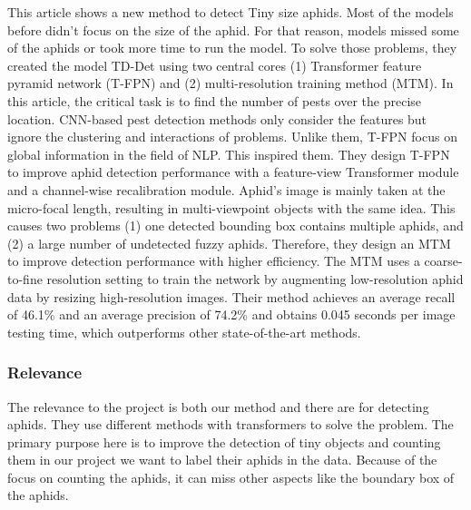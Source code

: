 \documentclass{article}
\begin{document}
This article shows a new method to detect Tiny size aphids. 
Most of the models before didn't focus on the size of the aphid. For that reason, 
models missed some of the aphids or took more time to run the model. To solve those problems, 
they created the model TD-Det using two central cores (1) Transformer feature pyramid network 
(T-FPN) and (2) multi-resolution training method (MTM). In this article, the critical task is to find the 
number of pests over the precise location. CNN-based pest detection methods only consider the 
features but ignore the clustering and interactions of problems. Unlike them, T-FPN focus on global 
information in the field of NLP. This inspired them. They design T-FPN to improve aphid detection 
performance with a feature-view Transformer module and a channel-wise recalibration module. 
Aphid's image is mainly taken at the micro-focal length, resulting in multi-viewpoint objects with the same idea. 
This causes two problems (1) one detected bounding box contains multiple aphids, and (2) a large number of 
undetected fuzzy aphids. Therefore, they design an MTM to improve detection performance with higher efficiency. 
The MTM uses a coarse-to-fine resolution setting to train the network by augmenting low-resolution 
aphid data by resizing high-resolution images. Their method achieves an average recall of 46.1\% and an average 
precision of 74.2\% and obtains 0.045 seconds per image testing time, which outperforms other 
state-of-the-art methods.

\subsubsection*{Relevance}
The relevance to the project is both our method and there are for detecting aphids. 
They use different methods with transformers to solve the problem. The primary purpose here 
is to improve the detection of tiny objects and counting them in our project we want to label their 
aphids in the data. Because of the focus on counting the aphids, it can miss other aspects like 
the boundary box of the aphids.
\end{document}
